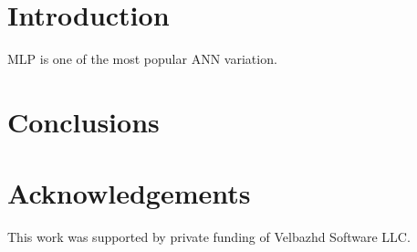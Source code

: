 \documentclass{llncs}
\begin{document}

\section{Introduction}

MLP is one of the most popular ANN variation. 

\section{Conclusions}


\section*{Acknowledgements}

This work was supported by private funding of Velbazhd Software LLC.

\end{document}
